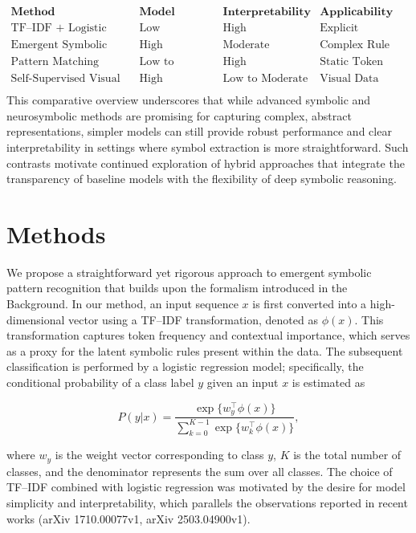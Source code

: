 \documentclass{article}
\begin{document}
\[
\begin{array}{l|ccc}
\textbf{Method} & \textbf{Model Complexity} & \textbf{Interpretability} & \textbf{Applicability} \\\hline
\text{TF–IDF + Logistic Regression (This work)} & \text{Low} & \text{High} & \text{Explicit Symbolic Patterns} \\
\text{Emergent Symbolic Mechanisms (arXiv 2502.20332v1)} & \text{High} & \text{Moderate} & \text{Complex Rule Structures} \\
\text{Pattern Matching (arXiv 1710.00077v1)} & \text{Low to Medium} & \text{High} & \text{Static Token Patterns} \\
\text{Self-Supervised Visual Tokenization (arXiv 2503.04900v1)} & \text{High} & \text{Low to Moderate} & \text{Visual Data} \\
\end{array}
\]
This comparative overview underscores that while advanced symbolic and neurosymbolic methods are promising for capturing complex, abstract representations, simpler models can still provide robust performance and clear interpretability in settings where symbol extraction is more straightforward. Such contrasts motivate continued exploration of hybrid approaches that integrate the transparency of baseline models with the flexibility of deep symbolic reasoning.

\section{Methods}
We propose a straightforward yet rigorous approach to emergent symbolic pattern recognition that builds upon the formalism introduced in the Background. In our method, an input sequence \( x \) is first converted into a high-dimensional vector using a TF–IDF transformation, denoted as \(\phi(x)\). This transformation captures token frequency and contextual importance, which serves as a proxy for the latent symbolic rules present within the data. The subsequent classification is performed by a logistic regression model; specifically, the conditional probability of a class label \( y \) given an input \( x \) is estimated as

\[
P(y|x) = \frac{\exp\{w_y^\top \phi(x)\}}{\sum_{k=0}^{K-1} \exp\{w_k^\top \phi(x)\}},
\]

where \(w_y\) is the weight vector corresponding to class \(y\), \(K\) is the total number of classes, and the denominator represents the sum over all classes. The choice of TF–IDF combined with logistic regression was motivated by the desire for model simplicity and interpretability, which parallels the observations reported in recent works (arXiv 1710.00077v1, arXiv 2503.04900v1).
\end{document}
